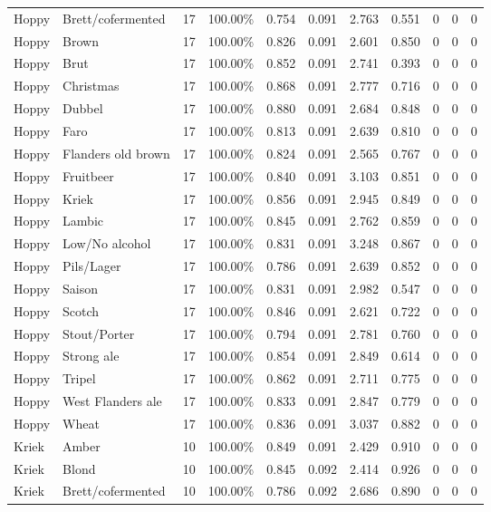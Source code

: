 {\begin{longtable}{llrrrrrrrrr}
Hoppy & Brett/cofermented & 17 & 100.00\% & 0.754 & 0.091 & 2.763 & 0.551 & 0 & 0 & 0 \\
Hoppy & Brown & 17 & 100.00\% & 0.826 & 0.091 & 2.601 & 0.850 & 0 & 0 & 0 \\
Hoppy & Brut & 17 & 100.00\% & 0.852 & 0.091 & 2.741 & 0.393 & 0 & 0 & 0 \\
Hoppy & Christmas & 17 & 100.00\% & 0.868 & 0.091 & 2.777 & 0.716 & 0 & 0 & 0 \\
Hoppy & Dubbel & 17 & 100.00\% & 0.880 & 0.091 & 2.684 & 0.848 & 0 & 0 & 0 \\
Hoppy & Faro & 17 & 100.00\% & 0.813 & 0.091 & 2.639 & 0.810 & 0 & 0 & 0 \\
Hoppy & Flanders old brown & 17 & 100.00\% & 0.824 & 0.091 & 2.565 & 0.767 & 0 & 0 & 0 \\
Hoppy & Fruitbeer & 17 & 100.00\% & 0.840 & 0.091 & 3.103 & 0.851 & 0 & 0 & 0 \\
Hoppy & Kriek & 17 & 100.00\% & 0.856 & 0.091 & 2.945 & 0.849 & 0 & 0 & 0 \\
Hoppy & Lambic & 17 & 100.00\% & 0.845 & 0.091 & 2.762 & 0.859 & 0 & 0 & 0 \\
Hoppy & Low/No alcohol & 17 & 100.00\% & 0.831 & 0.091 & 3.248 & 0.867 & 0 & 0 & 0 \\
Hoppy & Pils/Lager & 17 & 100.00\% & 0.786 & 0.091 & 2.639 & 0.852 & 0 & 0 & 0 \\
Hoppy & Saison & 17 & 100.00\% & 0.831 & 0.091 & 2.982 & 0.547 & 0 & 0 & 0 \\
Hoppy & Scotch & 17 & 100.00\% & 0.846 & 0.091 & 2.621 & 0.722 & 0 & 0 & 0 \\
Hoppy & Stout/Porter & 17 & 100.00\% & 0.794 & 0.091 & 2.781 & 0.760 & 0 & 0 & 0 \\
Hoppy & Strong ale & 17 & 100.00\% & 0.854 & 0.091 & 2.849 & 0.614 & 0 & 0 & 0 \\
Hoppy & Tripel & 17 & 100.00\% & 0.862 & 0.091 & 2.711 & 0.775 & 0 & 0 & 0 \\
Hoppy & West Flanders ale & 17 & 100.00\% & 0.833 & 0.091 & 2.847 & 0.779 & 0 & 0 & 0 \\
Hoppy & Wheat & 17 & 100.00\% & 0.836 & 0.091 & 3.037 & 0.882 & 0 & 0 & 0 \\
Kriek & Amber & 10 & 100.00\% & 0.849 & 0.091 & 2.429 & 0.910 & 0 & 0 & 0 \\
Kriek & Blond & 10 & 100.00\% & 0.845 & 0.092 & 2.414 & 0.926 & 0 & 0 & 0 \\
Kriek & Brett/cofermented & 10 & 100.00\% & 0.786 & 0.092 & 2.686 & 0.890 & 0 & 0 & 0 \\

\end{longtable}}
